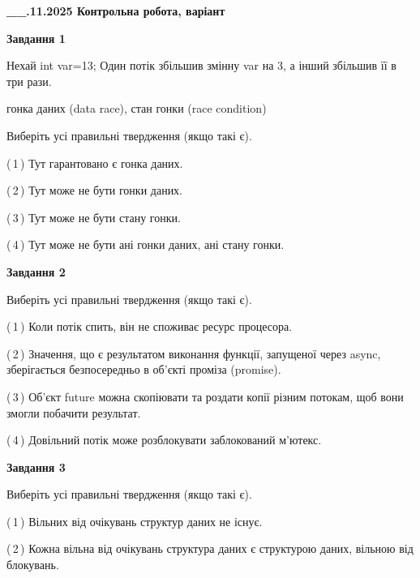 \documentclass[12pt, ukrainian]{article}
\begin{document}
\begin {large}

\textbf{\_\_.11.2025 Контрольна робота, варіант  }\par


{

\begin{center}
\textbf{Завдання 1}
\end{center}
Нехай int var=13; Один потік збільшив змінну var на 3, а інший збільшив її в три рази.

гонка даних (data race), стан гонки (race condition)

Виберіть усі правильні твердження (якщо такі є).\par
\vspace{2mm}
(\,1\,) Тут гарантовано є гонка даних.%

(\,2\,) Тут може не бути гонки даних.%

(\,3\,) Тут може не бути стану гонки.%

(\,4\,) Тут може не бути ані гонки даних, ані стану гонки.%



\begin{center}
\textbf{Завдання 2}
\end{center}
Виберіть усі правильні твердження (якщо такі є).\par
\vspace{2mm}

(\,1\,) Коли потік спить, він не споживає ресурс процесора.%

(\,2\,) Значення, що є результатом виконання функції, запущеної через async, зберігається безпосередньо в об’єкті проміза (promise).%

(\,3\,) Об’єкт future можна скопіювати та роздати копії різним потокам, щоб вони змогли побачити результат.%

(\,4\,) Довільний потік може розблокувати заблокований м’ютекс.%



\begin{center}
\textbf{Завдання 3}
\end{center}
Виберіть усі правильні твердження (якщо такі є).\par
\vspace{2mm}

(\,1\,) Вільних від очікувань структур даних не існує.%

(\,2\,) Кожна вільна від очікувань структура даних є структурою даних, вільною від блокувань.%

}
\end{large}
\end{document}
